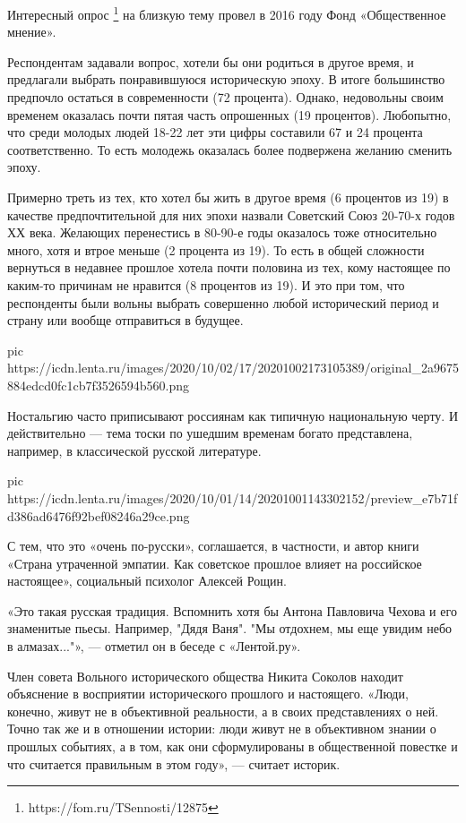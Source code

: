 Интересный опрос \footnote{https://fom.ru/TSennosti/12875} на близкую тему
провел в 2016 году Фонд «Общественное мнение».

Респондентам задавали вопрос, хотели бы они родиться в другое время, и
предлагали выбрать понравившуюся историческую эпоху. В итоге большинство
предпочло остаться в современности (72 процента). Однако, недовольны своим
временем оказалась почти пятая часть опрошенных (19 процентов). Любопытно, что
среди молодых людей 18-22 лет эти цифры составили 67 и 24 процента
соответственно. То есть молодежь оказалась более подвержена желанию сменить
эпоху.

Примерно треть из тех, кто хотел бы жить в другое время (6 процентов из 19) в
качестве предпочтительной для них эпохи назвали Советский Союз 20-70-х годов ХХ
века. Желающих перенестись в 80-90-е годы оказалось тоже относительно много,
хотя и втрое меньше (2 процента из 19). То есть в общей сложности вернуться в
недавнее прошлое хотела почти половина из тех, кому настоящее по каким-то
причинам не нравится (8 процентов из 19). И это при том, что респонденты были
вольны выбрать совершенно любой исторический период и страну или вообще
отправиться в будущее.

\ifcmt
pic https://icdn.lenta.ru/images/2020/10/02/17/20201002173105389/original_2a9675884edcd0fc1cb7f3526594b560.png
\fi

Ностальгию часто приписывают россиянам как типичную национальную черту. И
действительно — тема тоски по ушедшим временам богато представлена, например, в
классической русской литературе.

\ifcmt
pic https://icdn.lenta.ru/images/2020/10/01/14/20201001143302152/preview_e7b71fd386ad6476f92bef08246a29ce.png
\fi

С тем, что это «очень по-русски», соглашается, в частности, и автор книги
«Страна утраченной эмпатии. Как советское прошлое влияет на российское
настоящее», социальный психолог Алексей Рощин.

«Это такая русская традиция. Вспомнить хотя бы Антона Павловича Чехова и его
знаменитые пьесы. Например, "Дядя Ваня". "Мы отдохнем, мы еще увидим небо в
алмазах..."», — отметил он в беседе с «Лентой.ру».

Член совета Вольного исторического общества Никита Соколов находит объяснение в
восприятии исторического прошлого и настоящего. «Люди, конечно, живут не в
объективной реальности, а в своих представлениях о ней. Точно так же и в
отношении истории: люди живут не в объективном знании о прошлых событиях, а в
том, как они сформулированы в общественной повестке и что считается правильным
в этом году», — считает историк.

